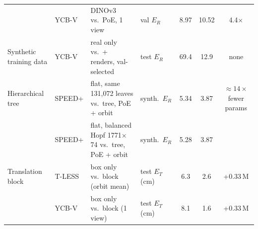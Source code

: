 \begin{tabular}{@{}l l l l cc c@{}}
 & YCB-V & DINOv3 vs.\ PoE, 1 view & val $E_R$ & 8.97 & 10.52 & 4.4$\times$ \\  %
\addlinespace[2pt]
Synthetic training data & YCB-V & real only vs.\ + renders, val-selected & test $E_R$ & 69.4 & 12.9 & none \\  %
\addlinespace[2pt]
Hierarchical tree & SPEED+ & flat, same 131,072 leaves vs.\ tree, PoE + orbit & synth.\ $E_R$ & 5.34 & 3.87 & $\approx14\times$ fewer params \\  %
 & SPEED+ & flat, balanced Hopf 1771$\times$74 vs.\ tree, PoE + orbit & synth.\ $E_R$ & 5.28 & 3.87 &  \\  %
\addlinespace[2pt]
Translation block & T-LESS & box only vs.\ block (orbit mean) & test $E_T$ (cm) & 6.3 & 2.6 & +0.33\,M \\  %
 & YCB-V & box only vs.\ block (1 view) & test $E_T$ (cm) & 8.1 & 1.6 & +0.33\,M \\  %
\bottomrule
\end{tabular}